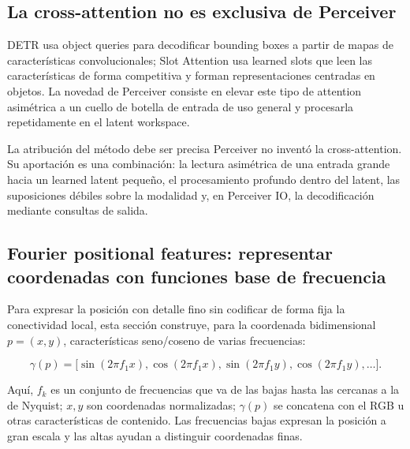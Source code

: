 \subsection{La cross-attention no es exclusiva de Perceiver}

DETR usa object queries para decodificar bounding boxes a partir de mapas de características convolucionales; Slot Attention usa learned slots que leen las características de forma competitiva y forman representaciones centradas en objetos. La novedad de Perceiver consiste en elevar este tipo de attention asimétrica a un cuello de botella de entrada de uso general y procesarla repetidamente en el latent workspace.


\begin{importantbox}{La atribución del método debe ser precisa}
Perceiver no inventó la cross-attention. Su aportación es una combinación: la lectura asimétrica de una entrada grande hacia un learned latent pequeño, el procesamiento profundo dentro del latent, las suposiciones débiles sobre la modalidad y, en Perceiver IO, la decodificación mediante consultas de salida.
\end{importantbox}

\subsection{Fourier positional features: representar coordenadas con funciones base de frecuencia}

Para expresar la posición con detalle fino sin codificar de forma fija la conectividad local, esta sección construye, para la coordenada bidimensional $p=(x,y)$, características seno/coseno de varias frecuencias:

\[
\gamma(p)=\big[\sin(2\pi f_1x),\cos(2\pi f_1x),\sin(2\pi f_1y),\cos(2\pi f_1y),\ldots\big].
\]

Aquí, $f_k$ es un conjunto de frecuencias que va de las bajas hasta las cercanas a la de Nyquist; $x,y$ son coordenadas normalizadas; $\gamma(p)$ se concatena con el RGB u otras características de contenido. Las frecuencias bajas expresan la posición a gran escala y las altas ayudan a distinguir coordenadas finas.


